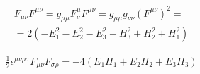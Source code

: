 $$\begin{gather}
F_{\mu \nu}F^{\mu \nu} = g_{\mu \mu}F^{\mu}_{\nu}F^{\mu \nu} = g_{\mu \mu}g_{\nu \nu}(F^{\mu \nu})^{2} = \\
= 2(-E_{1}^{2} -E_{2}^{2} - E_{3}^{2} + H_{3}^{2} + H_{2}^{2} + H_{1}^{2})
\end{gather}$$

$$\begin{gather}
\frac{1}{2}\epsilon^{\mu \nu \rho\sigma}F_{\mu \nu}F_{\sigma \rho} = -4(E_{1}H_{1} +E_{2}H_{2} + E_{3}H_{3}) \\
\end{gather}$$
